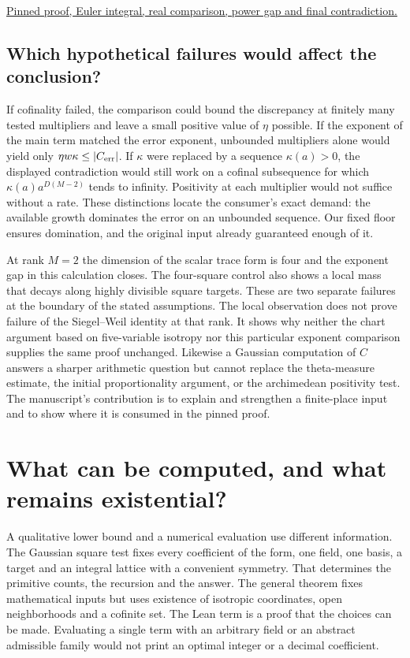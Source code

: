 \documentclass[12pt,letterpaper]{article}
\begin{document}
\begin{flushleft}\small
\href{https://github.com/nousentllc/riemann-hypothesis/blob/40e56bab026552e089d7afcfeff08d2defb9c005/src/CompanionTheory/AutomorphicTheory/ThetaDilations/SwOne.lean#L67-L101}{Pinned proof, Euler integral, real comparison, power gap and final contradiction.}
\end{flushleft}

\subsection{Which hypothetical failures would affect the conclusion?}
If cofinality failed, the comparison could bound the discrepancy at finitely many tested multipliers and leave a small positive value of $\eta$ possible. If the exponent of the main term matched the error exponent, unbounded multipliers alone would yield only $\eta w\kappa\le|C_{\rm err}|$. If $\kappa$ were replaced by a sequence $\kappa(a)>0$, the displayed contradiction would still work on a cofinal subsequence for which $\kappa(a)a^{D(M-2)}$ tends to infinity. Positivity at each multiplier would not suffice without a rate. These distinctions locate the consumer's exact demand: the available growth dominates the error on an unbounded sequence. Our fixed floor ensures domination, and the original input already guaranteed enough of it.

At rank $M=2$ the dimension of the scalar trace form is four and the exponent gap in this calculation closes. The four-square control also shows a local mass that decays along highly divisible square targets. These are two separate failures at the boundary of the stated assumptions. The local observation does not prove failure of the Siegel--Weil identity at that rank. It shows why neither the chart argument based on five-variable isotropy nor this particular exponent comparison supplies the same proof unchanged. Likewise a Gaussian computation of $C$ answers a sharper arithmetic question but cannot replace the theta-measure estimate, the initial proportionality argument, or the archimedean positivity test. The manuscript's contribution is to explain and strengthen a finite-place input and to show where it is consumed in the pinned proof.

\section{What can be computed, and what remains existential?}
A qualitative lower bound and a numerical evaluation use different information. The Gaussian square test fixes every coefficient of the form, one field, one basis, a target and an integral lattice with a convenient symmetry. That determines the primitive counts, the recursion and the answer. The general theorem fixes mathematical inputs but uses existence of isotropic coordinates, open neighborhoods and a cofinite set. The Lean term is a proof that the choices can be made. Evaluating a single term with an arbitrary field or an abstract admissible family would not print an optimal integer or a decimal coefficient.
\end{document}
